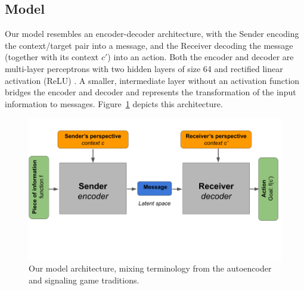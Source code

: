 \documentclass[11pt,a4paper]{article}
\DeclareMathOperator*{\argmax}{arg\,max}
\DeclareMathOperator*{\argmin}{arg\,min}
\newcommand{\nbSST}[1]{{\leavevmode\color{violet}{\scriptsize#1}}}
\begin{document}

\nbSST{cite my forthcoming philosophy of science paper instead? pre-print is only on my website, so URL would be sort of de-anonymizing}

\subsection{Model}

Our model resembles an encoder-decoder architecture, with the Sender encoding the context/target pair into a message, and the Receiver decoding the message (together with its context $c'$) into an action.  Both the encoder and decoder are multi-layer perceptrons with two hidden layers of size 64 and rectified linear activation (ReLU) \citep{Nair2010, Glorot2011}. A smaller, intermediate layer without an activation function bridges the encoder and decoder and represents the transformation of the input information to messages. Figure~\ref{fig:model} depicts this architecture.

\begin{figure}[ht]
	\centering
	\includegraphics[width=\columnwidth, trim=0 150 0 40]{figures/model_figure_v2.png}
	\caption{Our model architecture, mixing terminology from the autoencoder and signaling game traditions.}
	\label{fig:model}
\end{figure}
\end{document}
